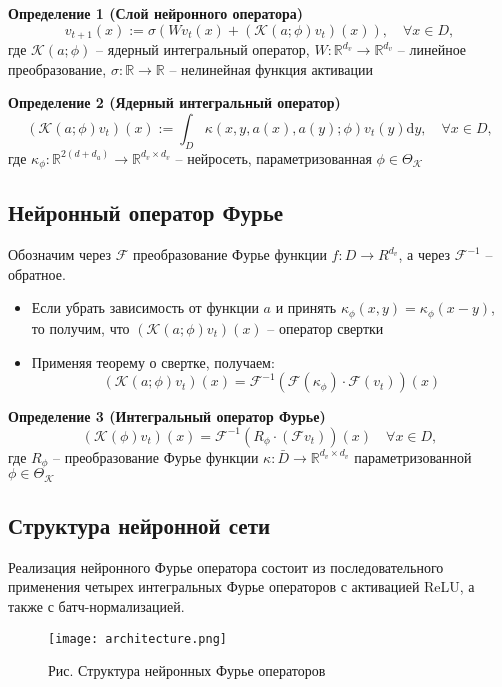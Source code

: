 \textbf{Определение 1 (Слой нейронного оператора)}
	$$v_{t+1}(x):=\sigma\left(W v_{t}(x)+\left(\mathcal{K}(a ; \phi) v_{t}\right)(x)\right), \quad \forall x \in D,$$
	где  $\mathcal{K}(a ; \phi)$ -- ядерный интегральный оператор, $W: \mathbb{R}^{d_{v}} \rightarrow \mathbb{R}^{d_{v}}$ -- линейное преобразование, $\sigma: \mathbb{R} \rightarrow \mathbb{R}$ -- нелинейная функция активации


\textbf{Определение 2 (Ядерный интегральный оператор)}
	$$
	\left(\mathcal{K}(a ; \phi) v_{t}\right)(x):=\int_{D} \kappa(x, y, a(x), a(y) ; \phi) v_{t}(y) \mathrm{d} y, \quad \forall x \in D,$$
	где  $\kappa_{\phi}: \mathbb{R}^{2\left(d+d_{a}\right)} \rightarrow \mathbb{R}^{d_{v} \times d_{v}}$ --  нейросеть, параметризованная $\phi \in \Theta_{\mathcal{K}}$

\subsection{Нейронный оператор Фурье}
Обозначим через $\mathcal{F}$ преобразование Фурье функции $f: D \to R^{d_v}$, а через $\mathcal{F}^{-1}$ -- обратное.
\begin{itemize}
	\item Если убрать зависимость от функции $a$ и принять $\kappa_{\phi}(x, y)=\kappa_{\phi}(x-y)$, то получим, что $\left(\mathcal{K}(a ; \phi) v_{t}\right)(x)$ -- оператор свертки
	\item Применяя теорему о свертке, получаем:
	$$
	\left(\mathcal{K}(a ; \phi) v_{t}\right)(x)=\mathcal{F}^{-1}\left(\mathcal{F}\left(\kappa_{\phi}\right) \cdot \mathcal{F}\left(v_{t}\right)\right)(x) $$
	
\end{itemize}

\textbf{Определение 3 (Интегральный оператор Фурье)}
	$$
	\left(\mathcal{K}(\phi) v_{t}\right)(x)=\mathcal{F}^{-1}\left(R_{\phi} \cdot\left(\mathcal{F} v_{t}\right)\right)(x) \quad \forall x \in D,
	$$ 
	где $R_{\phi}$ -- преобразование Фурье функции $\kappa: \bar{D} \rightarrow \mathbb{R}^{d_{v} \times d_{v}}$ параметризованной $\phi \in \Theta_{\mathcal{K}}$
	
\subsection{Структура нейронной сети}
	Реализация нейронного Фурье оператора состоит из последовательного применения четырех интегральных Фурье операторов с активацией ReLU, а также с батч-нормализацией. 
	\begin{figure}[h]
		\centering
		\texttt{[image: architecture.png]}
		\caption{Рис.  Структура нейронных Фурье операторов}
	\end{figure}

